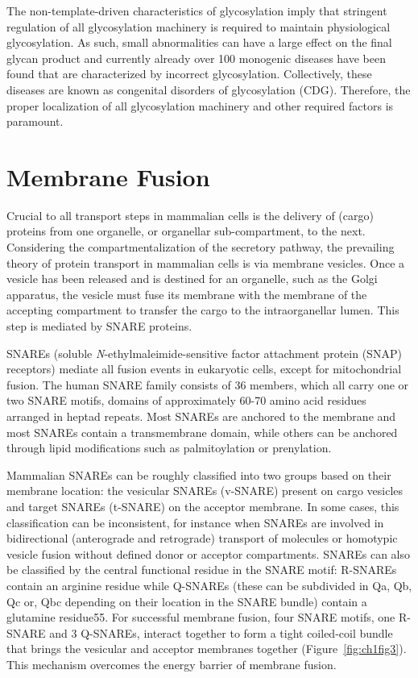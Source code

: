 The non-template-driven characteristics of glycosylation imply that stringent regulation of all glycosylation machinery is required to maintain physiological glycosylation. As such, small abnormalities can have a large effect on the final glycan product\cite{jaiman_golgi_2020} and currently already over 100 monogenic diseases have been found that are characterized by incorrect glycosylation. Collectively, these diseases are known as congenital disorders of glycosylation (CDG)\cite{linders_sugary_2020,fisher_bridging_2016,freeze_genetic_2006,freeze_solving_2014}. Therefore, the proper localization of all glycosylation machinery and other required factors is paramount.


\section{Membrane Fusion}

Crucial to all transport steps in mammalian cells is the delivery of (cargo) proteins from one organelle, or organellar sub-compartment, to the next. Considering the compartmentalization of the secretory pathway, the prevailing theory of protein transport in mammalian cells is via membrane vesicles. Once a vesicle has been released and is destined for an organelle, such as the Golgi apparatus, the vesicle must fuse its membrane with the membrane of the accepting compartment to transfer the cargo to the intraorganellar lumen. This step is mediated by SNARE proteins.

SNAREs (soluble \emph{N}-ethylmaleimide-sensitive factor attachment protein (SNAP) receptors) mediate all fusion events in eukaryotic cells, except for mitochondrial fusion\cite{jahn_snares_2006,hong_snares_2005}. The human SNARE family consists of 36 members, which all carry one or two SNARE motifs, domains of approximately 60-70 amino acid residues arranged in heptad repeats\cite{weimbs_conserved_1997}. Most SNAREs are anchored to the membrane and most SNAREs contain a transmembrane domain, while others can be anchored through lipid modifications such as palmitoylation or prenylation.

Mammalian SNAREs can be roughly classified into two groups based on their membrane location: the vesicular SNAREs (v-SNARE) present on cargo vesicles and target SNAREs (t-SNARE) on the acceptor membrane. In some cases, this classification can be inconsistent, for instance when SNAREs are involved in bidirectional (anterograde and retrograde) transport of molecules or homotypic vesicle fusion without defined donor or acceptor compartments. SNAREs can also be classified by the central functional residue in the SNARE motif: R-SNAREs contain an arginine residue while Q-SNAREs (these can be subdivided in Qa, Qb, Qc or, Qbc depending on their location in the SNARE bundle) contain a glutamine residue55. For successful membrane fusion, four SNARE motifs, one R-SNARE and 3 Q-SNAREs, interact together to form a tight coiled-coil bundle that brings the vesicular and acceptor membranes together (Figure~\ref{fig:ch1fig3}). This mechanism overcomes the energy barrier of membrane fusion.

